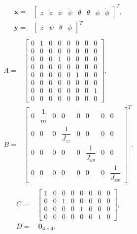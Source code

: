 \begin{align}
\begin{split}
\mathbf{x} = & \begin{bmatrix}
z & \dot{z} & \psi & \dot{\psi} & \theta & \dot{\theta} & \phi & \dot{\phi}
\end{bmatrix}^{T},\\[15px]
\mathbf{y} = & \begin{bmatrix}
z & \psi & \theta & \phi
\end{bmatrix}^{T}
\end{split}
\end{align}
\begin{align}
\begin{split}
A = & 
\begin{bmatrix}
0 & 1 & 0 & 0 & 0 & 0 & 0 & 0\\[2px]
0 & 0 & 0 & 0 & 0 & 0 & 0 & 0\\[2px]
0 & 0 & 0 & 1 & 0 & 0 & 0 & 0\\[2px]
0 & 0 & 0 & 0 & 0 & 0 & 0 & 0\\[2px]
0 & 0 & 0 & 0 & 0 & 1 & 0 & 0\\[2px]
0 & 0 & 0 & 0 & 0 & 0 & 0 & 0\\[2px]
0 & 0 & 0 & 0 & 0 & 0 & 0 & 1\\[2px]
0 & 0 & 0 & 0 & 0 & 0 & 0 & 0
\end{bmatrix}, \\[15px]
B = & 
\begin{bmatrix}
0 & \dfrac{1}{m} & 0 & 0 & 0 & 0 & 0 & 0\\[5px]
0 & 0 & 0 & \dfrac{1}{J_{zz}} & 0 & 0 & 0 & 0\\[5px]
0 & 0 & 0 & 0 & 0 & \dfrac{1}{J_{yy}} & 0 & 0\\[5px]
0 & 0 & 0 & 0 & 0 & 0 & 0 & \dfrac{1}{J_{xx}}
\end{bmatrix}^{T}.
\end{split}
\end{align}
\begin{align}
\begin{split}
C = & 
\begin{bmatrix}
1 & 0 & 0 & 0 & 0 & 0 & 0 & 0 \\[2px]
0 & 0 & 1 & 0 & 0 & 0 & 0 & 0 \\[2px]
0 & 0 & 0 & 0 & 1 & 0 & 0 & 0 \\[2px]
0 & 0 & 0 & 0 & 0 & 0 & 1 & 0 
\end{bmatrix}, \\[15px]
D = &\ \mathbf{0_{4\times 4}}.
\end{split}
\end{align}

